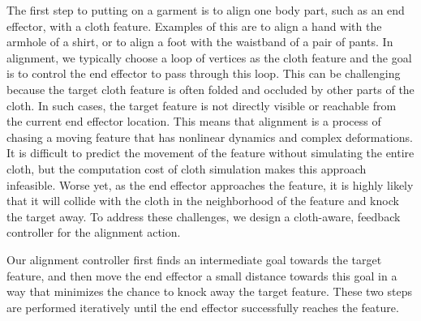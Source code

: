 The first step to putting on a garment is to align one body part, such as an end effector, with a cloth feature. Examples of this are to align a hand with the armhole of a shirt, or to align a foot with the waistband of a pair of pants. In alignment, we typically choose a loop of vertices as the cloth feature and the goal is to control the end effector to pass through this loop. This can be challenging because the target cloth feature is often folded and occluded by other parts of the cloth. In such cases, the target feature is not directly visible or reachable from the current end effector location. This means that alignment is a process of chasing a moving feature that has nonlinear dynamics and complex deformations. It is difficult to predict the movement of the feature without simulating the entire cloth, but the computation cost of cloth simulation makes this approach infeasible. Worse yet, as the end effector approaches the feature, it is highly likely that it will collide with the cloth in the neighborhood of the feature and knock the target away.  To address these challenges, we design a cloth-aware, feedback controller for the alignment action.

Our alignment controller first finds an intermediate goal towards the target feature, and then move the end effector a small distance towards this goal in a way that minimizes the chance to knock away the target feature. These two steps are performed iteratively until the end effector successfully reaches the feature. 


